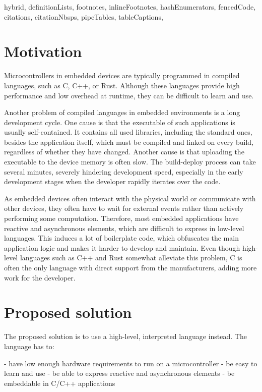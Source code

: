 \begin{markdown*}{%
  hybrid,
  definitionLists,
  footnotes,
  inlineFootnotes,
  hashEnumerators,
  fencedCode,
  citations,
  citationNbsps,
  pipeTables,
  tableCaptions,
}

\chapter{Motivation}

Microcontrollers in embedded devices are typically programmed in compiled languages, such as C, C++, or Rust. Although these languages provide high performance and low overhead at runtime, they can be difficult to learn and use.

Another problem of compiled languages in embedded environments is a long development cycle. One cause is that the executable of such applications is usually self-contained. It contains all used libraries, including the standard ones, besides the application itself, which must be compiled and linked on every build, regardless of whether they have changed. Another cause is that uploading the executable to the device memory is often slow. The build-deploy process can take several minutes, severely hindering development speed, especially in the early development stages when the developer rapidly iterates over the code.

As embedded devices often interact with the physical world or communicate with other devices, they often have to wait for external events rather than actively performing some computation. Therefore, most embedded applications have reactive and asynchronous elements, which are difficult to express in low-level languages. This induces a lot of boilerplate code, which obfuscates the main application logic and makes it harder to develop and maintain. Even though high-level languages such as C++ and Rust somewhat alleviate this problem, C is often the only language with direct support from the manufacturers, adding more work for the developer.


\chapter{Proposed solution}

The proposed solution is to use a high-level, interpreted language instead. The language has to:

  - have low enough hardware requirements to run on a microcontroller
  - be easy to learn and use
  - be able to express reactive and asynchronous elements
  - be embeddable in C/C++ applications


\end{markdown*}
